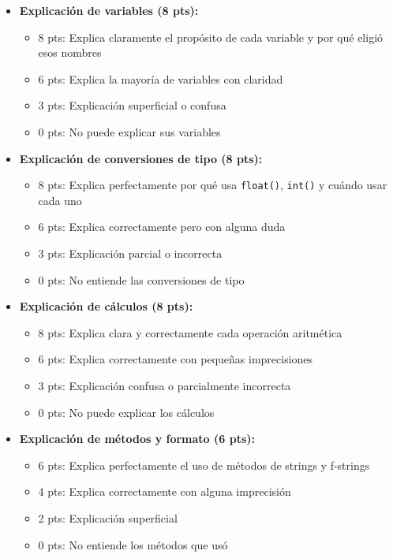 \documentclass[12pt,a4paper]{article}
\begin{document}
\begin{itemize}[leftmargin=*]
    \item \textbf{Explicación de variables (8 pts):}
    \begin{itemize}
        \item 8 pts: Explica claramente el propósito de cada variable y por qué eligió esos nombres
        \item 6 pts: Explica la mayoría de variables con claridad
        \item 3 pts: Explicación superficial o confusa
        \item 0 pts: No puede explicar sus variables
    \end{itemize}
    
    \item \textbf{Explicación de conversiones de tipo (8 pts):}
    \begin{itemize}
        \item 8 pts: Explica perfectamente por qué usa \texttt{float()}, \texttt{int()} y cuándo usar cada uno
        \item 6 pts: Explica correctamente pero con alguna duda
        \item 3 pts: Explicación parcial o incorrecta
        \item 0 pts: No entiende las conversiones de tipo
    \end{itemize}
    
    \item \textbf{Explicación de cálculos (8 pts):}
    \begin{itemize}
        \item 8 pts: Explica clara y correctamente cada operación aritmética
        \item 6 pts: Explica correctamente con pequeñas imprecisiones
        \item 3 pts: Explicación confusa o parcialmente incorrecta
        \item 0 pts: No puede explicar los cálculos
    \end{itemize}
    
    \item \textbf{Explicación de métodos y formato (6 pts):}
    \begin{itemize}
        \item 6 pts: Explica perfectamente el uso de métodos de strings y f-strings
        \item 4 pts: Explica correctamente con alguna imprecisión
        \item 2 pts: Explicación superficial
        \item 0 pts: No entiende los métodos que usó
    \end{itemize}
\end{itemize}
\end{document}
